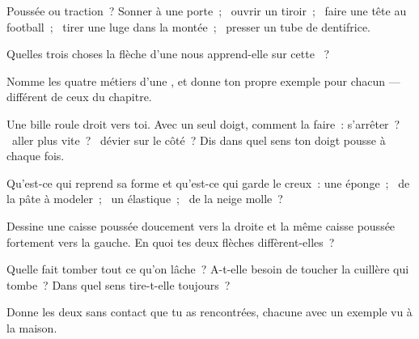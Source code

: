 \begin{exercise}[$\star$]\label{exo:g2:pushes-and-pulls:1}
Poussée ou traction~? Sonner à une porte~; \ ouvrir un tiroir~; \ faire
une tête au football~; \ tirer une luge dans la montée~; \ presser un
tube de dentifrice.
\end{exercise}

\begin{exercise}[$\star$]\label{exo:g2:pushes-and-pulls:2}
Quelles trois choses la flèche d'une  nous apprend-elle sur
cette ~?
\end{exercise}

\begin{exercise}[$\star$]\label{exo:g2:pushes-and-pulls:3}
Nomme les quatre métiers d'une , et donne ton propre exemple
pour chacun --- différent de ceux du chapitre.
\end{exercise}

\begin{exercise}[$\star$]\label{exo:g2:pushes-and-pulls:4}
Une bille roule droit vers toi. Avec un seul doigt, comment la faire~:
s'arrêter~? \ aller plus vite~? \ dévier sur le côté~? Dis dans quel
sens ton doigt pousse à chaque fois.
\end{exercise}

\begin{exercise}[$\star$]\label{exo:g2:pushes-and-pulls:5}
Qu'est-ce qui reprend sa forme et qu'est-ce qui garde le creux~: une
éponge~; \ de la pâte à modeler~; \ un élastique~; \ de la neige
molle~?
\end{exercise}

\begin{exercise}[$\star$]\label{exo:g2:pushes-and-pulls:6}
Dessine une caisse poussée doucement vers la droite et la même caisse
poussée fortement vers la gauche. En quoi tes deux flèches
diffèrent-elles~?
\end{exercise}

\begin{exercise}[$\star$]\label{exo:g2:pushes-and-pulls:7}
Quelle  fait tomber tout ce qu'on lâche~? A-t-elle besoin de
toucher la cuillère qui tombe~? Dans quel sens tire-t-elle toujours~?
\end{exercise}

\begin{exercise}[$\star$]\label{exo:g2:pushes-and-pulls:8}
Donne les deux  sans contact que tu as rencontrées, chacune
avec un exemple vu à la maison.
\end{exercise}

